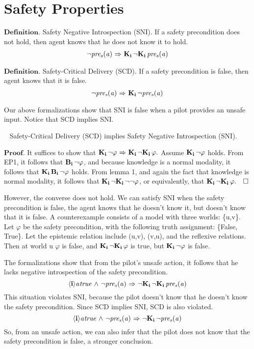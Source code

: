 \section{Safety Properties}
$\mathbf{Definition.}$ Safety Negative Introspection (SNI). If a safety precondition does not hold, then agent knows that he does not know it to hold. 
\begin{eqnarray*}
		{\neg} \mathit{pre_s}(\mathit{a}) {\ \Rightarrow \ } \mathbf{K}_{\mathbf{i}}\, {\neg} \mathbf{K}_{\mathbf{i}}\,\mathit{pre_s}(\mathit{a})
\end{eqnarray*}

\noindent$\mathbf{Definition.}$ Safety-Critical Delivery (SCD). If a safety precondition is false, then agent knows that it is false. 
\begin{eqnarray*}
		{\neg} \mathit{pre_s}(\mathit{a}) {\ \Rightarrow \ } \mathbf{K}_{\mathbf{i}}\,{\neg} \mathit{pre_s}(\mathit{a})
\end{eqnarray*}


Our above formalizations show that SNI is false when a pilot provides an unsafe input. 
Notice that SCD implies SNI.
\begin{lemma}~\label{udsni}
	Safety-Critical Delivery (SCD) implies Safety Negative Introspection (SNI).
\end{lemma}	
$\mathbf{Proof}$. It suffices to show that $\mathbf{K}_{\mathbf{i}}\,{\neg}\varphi {\ \Rightarrow \ } \mathbf{K}_{\mathbf{i}}\,{\neg}\mathbf{K}_{\mathbf{i}}\, \varphi.$
Assume $\mathbf{K}_{\mathbf{i}}\,{\neg}\varphi$ holds. From EP1, it follows that $\mathbf{B}_{\mathbf{i}}\,{\neg}\varphi$, and because knowledge is a normal modality, it follows that $\mathbf{K}_{\mathbf{i}}\,\mathbf{B}_{\mathbf{i}}\,{\neg}\varphi$ holds. From lemma 1, and again the fact that knowledge is normal modality, it follows that $\mathbf{K}_{\mathbf{i}}\,{\neg}\mathbf{K}_{\mathbf{i}}\,{\neg}{\neg}\varphi$, or equivalently, that $\mathbf{K}_{\mathbf{i}}\,{\neg}\mathbf{K}_{\mathbf{i}}\,\varphi.\quad\Box$

However, the converse does not hold. We can satisfy SNI when the safety precondition is false, the agent knows that he doesn't know it, but doesn't know that it is false. A counterexample consists of a model with three worlds: \{u,v\}. Let $\varphi$ be the safety precondition, with the following truth assignment: \{False, True\}. Let the epistemic relation include (u,v), (v,u), and the reflexive relations. Then at world u $\varphi$ is false, and $\mathbf{K}_{\mathbf{i}}\,{\neg}\mathbf{K}_{\mathbf{i}}\,\varphi$ is true, but $\mathbf{K}_{\mathbf{i}}\,{\neg} \varphi$ is false. 

The formalizations show that from the pilot's unsafe action, it follows that he lacks negative introspection of the safety precondition. 
\begin{equation}
\mathbf{\langle i\rangle}{\mathit{a}}\mathit{true} {\ \wedge \ } {\neg} \mathit{pre_s}(\mathit{a}) {\ \Rightarrow \ } {\neg} \mathbf{K}_{\mathbf{i}}\,{\neg} \mathbf{K}_{\mathbf{i}}\,\mathit{pre_s}(\mathit{a})
\end{equation}This situation violates SNI, because the pilot doesn't know that he doesn't know the safety precondition. Since SCD implies SNI, SCD is also violated.
\begin{equation}
\mathbf{\langle i\rangle}{\mathit{a}}\mathit{true} {\ \wedge \ } {\neg} \mathit{pre_s}(\mathit{a}) {\ \Rightarrow \ } {\neg} \mathbf{K}_{\mathbf{i}}\,{\neg} \mathit{pre_s}(\mathit{a})
\end{equation} So, from an unsafe action, we can also infer that the pilot does not know that the safety precondition is false, a stronger conclusion.  

